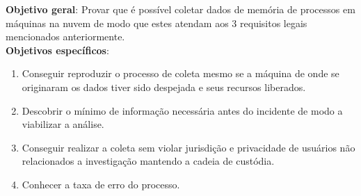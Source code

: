 \documentclass[12pt,				%
	openright,			%
	oneside,			%
	a4paper,			%
	english,			%
	brazil				%
	]{abntex2}
\begin{document}
\noindent \textbf{Objetivo geral}: Provar que é possível coletar dados de memória de processos em máquinas na nuvem de modo que estes atendam
aos 3 requisitos legais mencionados anteriormente. \\

\noindent \textbf{Objetivos específicos}:
\begin{enumerate}
 \item Conseguir reproduzir o processo de coleta mesmo se a máquina de onde se originaram os dados tiver sido despejada e seus recursos liberados.
 \item Descobrir o mínimo de informação necessária antes do incidente de modo a viabilizar a análise.
 \item Conseguir realizar a coleta sem violar jurisdição e privacidade de usuários não relacionados a investigação mantendo a cadeia de custódia.
 \item Conhecer a taxa de erro do processo.
\end{enumerate}
\end{document}

